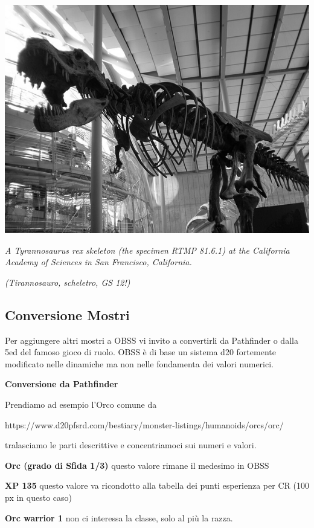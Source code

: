 \documentclass[a4paper,twoside,openany]{book}
\begin{document}
\begin{center}
\includegraphics[width=0.75\linewidth]{immagini/trex.png}

\emph{A Tyrannosaurus rex skeleton (the specimen RTMP 81.6.1) at the California Academy of Sciences in San Francisco, California.}

\emph{(Tirannosauro, scheletro, GS 12!)}
\end{center}




\pagebreak

\subsection{Conversione Mostri}

\bigskip

Per aggiungere altri mostri a OBSS vi invito a convertirli da Pathfinder o dalla 5ed del famoso gioco di ruolo. OBSS è di base un sistema d20 fortemente modificato nelle dinamiche ma non nelle fondamenta dei valori numerici.

\medskip

\textbf{Conversione da Pathfinder}

Prendiamo ad esempio l'Orco comune da

https://www.d20pfsrd.com/bestiary/monster-listings/humanoids/orcs/orc/

tralasciamo le parti descrittive e concentriamoci sui numeri e valori.

\bigskip{}

\textbf{Orc (grado di Sfida 1/3)} questo valore rimane il medesimo in OBSS

\textbf{XP 135} questo valore va ricondotto alla tabella dei punti esperienza per CR (100 px in questo caso)

\textbf{Orc warrior 1} non ci interessa la classe, solo al più la razza.
\end{document}
